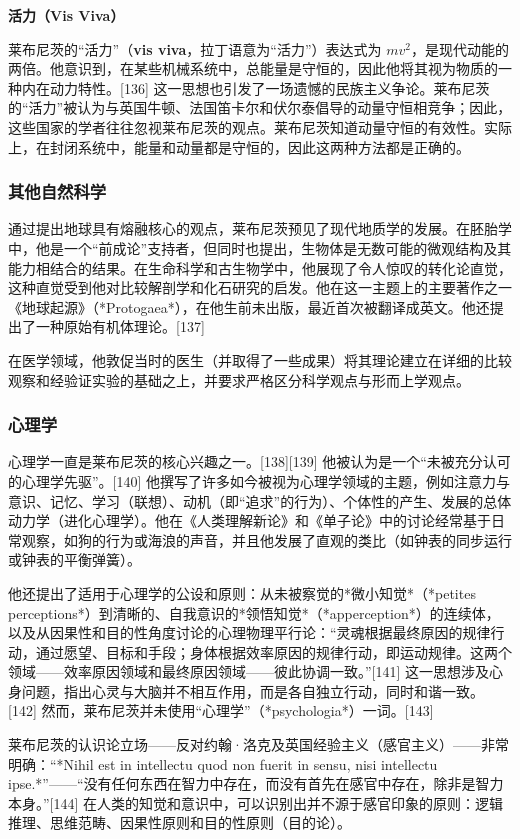 \textbf{活力（Vis Viva）}

莱布尼茨的“活力”（\textbf{vis viva}，拉丁语意为“活力”）表达式为 \( mv^2 \)，是现代动能的两倍。他意识到，在某些机械系统中，总能量是守恒的，因此他将其视为物质的一种内在动力特性。[136] 这一思想也引发了一场遗憾的民族主义争论。莱布尼茨的“活力”被认为与英国牛顿、法国笛卡尔和伏尔泰倡导的动量守恒相竞争；因此，这些国家的学者往往忽视莱布尼茨的观点。莱布尼茨知道动量守恒的有效性。实际上，在封闭系统中，能量和动量都是守恒的，因此这两种方法都是正确的。
\subsubsection{其他自然科学}
通过提出地球具有熔融核心的观点，莱布尼茨预见了现代地质学的发展。在胚胎学中，他是一个“前成论”支持者，但同时也提出，生物体是无数可能的微观结构及其能力相结合的结果。在生命科学和古生物学中，他展现了令人惊叹的转化论直觉，这种直觉受到他对比较解剖学和化石研究的启发。他在这一主题上的主要著作之一《地球起源》（*Protogaea*），在他生前未出版，最近首次被翻译成英文。他还提出了一种原始有机体理论。[137]  

在医学领域，他敦促当时的医生（并取得了一些成果）将其理论建立在详细的比较观察和经验证实验的基础之上，并要求严格区分科学观点与形而上学观点。
\subsubsection{心理学}
心理学一直是莱布尼茨的核心兴趣之一。[138][139] 他被认为是一个“未被充分认可的心理学先驱”。[140] 他撰写了许多如今被视为心理学领域的主题，例如注意力与意识、记忆、学习（联想）、动机（即“追求”的行为）、个体性的产生、发展的总体动力学（进化心理学）。他在《人类理解新论》和《单子论》中的讨论经常基于日常观察，如狗的行为或海浪的声音，并且他发展了直观的类比（如钟表的同步运行或钟表的平衡弹簧）。  

他还提出了适用于心理学的公设和原则：从未被察觉的*微小知觉*（*petites perceptions*）到清晰的、自我意识的*领悟知觉*（*apperception*）的连续体，以及从因果性和目的性角度讨论的心理物理平行论：“灵魂根据最终原因的规律行动，通过愿望、目标和手段；身体根据效率原因的规律行动，即运动规律。这两个领域——效率原因领域和最终原因领域——彼此协调一致。”[141] 这一思想涉及心身问题，指出心灵与大脑并不相互作用，而是各自独立行动，同时和谐一致。[142] 然而，莱布尼茨并未使用“心理学”（*psychologia*）一词。[143]  

莱布尼茨的认识论立场——反对约翰·洛克及英国经验主义（感官主义）——非常明确：“*Nihil est in intellectu quod non fuerit in sensu, nisi intellectu ipse.*”——“没有任何东西在智力中存在，而没有首先在感官中存在，除非是智力本身。”[144] 在人类的知觉和意识中，可以识别出并不源于感官印象的原则：逻辑推理、思维范畴、因果性原则和目的性原则（目的论）。

